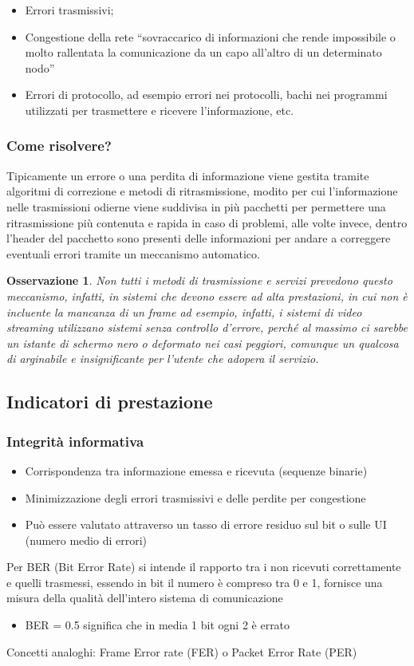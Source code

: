 \documentclass{book}
\newtheorem{oss}{Osservazione}[section]
\begin{document}
\begin{itemize}
\item Errori trasmissivi;
\item Congestione della rete ``sovraccarico di informazioni che rende impossibile o molto rallentata la
  comunicazione da un capo all'altro di un determinato nodo''
\item Errori di protocollo, ad esempio errori nei protocolli, bachi nei programmi utilizzati per trasmettere
  e ricevere l'informazione, etc.
\end{itemize}

\subsubsection{Come risolvere?}
\label{sec:riserrtr}
Tipicamente un errore o una perdita di informazione viene gestita tramite algoritmi di correzione e metodi di
ritrasmissione, modito per cui l'informazione nelle trasmissioni odierne viene suddivisa in più pacchetti per
permettere una ritrasmissione più contenuta e rapida in caso di problemi, alle volte invece, dentro l'header
del pacchetto sono presenti delle informazioni per andare a correggere eventuali errori tramite un meccanismo
automatico.
\begin{oss}
  Non tutti i metodi di trasmissione e  servizi prevedono questo meccanismo, infatti, in sistemi che devono essere
  ad alta prestazioni, in cui non è incluente la mancanza di un frame ad esempio, infatti, i sistemi
  di video streaming utilizzano sistemi senza controllo d'errore, perché al massimo ci sarebbe un istante
  di schermo nero o deformato nei casi peggiori, comunque un qualcosa di arginabile e insignificante per
  l'utente che adopera il servizio.
\end{oss}

\subsection{Indicatori di prestazione}
\label{sec:indprest}

\subsubsection{Integrità informativa}
\label{sec:intinfo}
\begin{itemize}
\item Corrispondenza tra informazione emessa e ricevuta (sequenze binarie)
\item Minimizzazione degli errori trasmissivi e delle perdite per congestione
\item Può essere valutato attraverso un tasso di errore residuo sul bit o sulle UI (numero medio di errori)
\end{itemize}
Per BER (Bit Error Rate) si intende il rapporto tra i non ricevuti correttamente e quelli trasmessi, essendo
in bit il numero è compreso tra 0 e 1, fornisce una misura della qualità dell'intero sistema di comunicazione
\begin{itemize}
\item BER = 0.5 significa che in media 1 bit ogni 2 è errato
\end{itemize}
Concetti analoghi: Frame Error rate (FER) o Packet Error Rate (PER)
\end{document}
